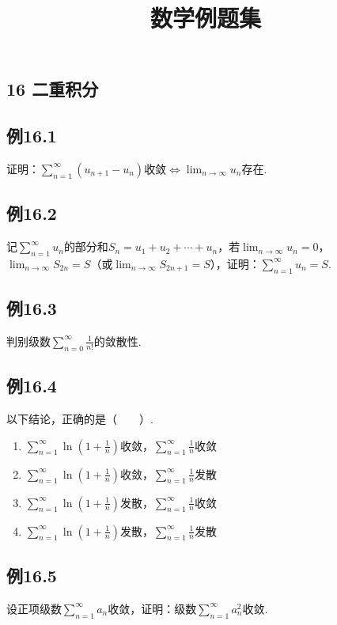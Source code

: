 \documentclass[UTF8]{ctexart}
\title{数学例题集}
\author{}
\date{}
\theoremstyle{remark}
\begin{document}
	\maketitle
	\begin{multicols}{2}
	\section*{16 二重积分}
	\subsection*{例16.1}
	证明：\(\sum_{n = 1}^{\infty}(u_{n + 1}-u_n)\)收敛\(\Leftrightarrow\lim_{n\rightarrow\infty}u_n\)存在.
	
	\subsection*{例16.2}
	记\(\sum_{n = 1}^{\infty}u_n\)的部分和\(S_n = u_1 + u_2+\cdots+u_n\)，若\(\lim_{n\rightarrow\infty}u_n = 0\)，\(\lim_{n\rightarrow\infty}S_{2n}=S\)（或\(\lim_{n\rightarrow\infty}S_{2n + 1}=S\)），证明：\(\sum_{n = 1}^{\infty}u_n=S\).
	
	\subsection*{例16.3}
	判别级数\(\sum_{n = 0}^{\infty}\frac{1}{n!}\)的敛散性.
	
	\subsection*{例16.4}
	以下结论，正确的是（~~~~）.
	\begin{enumerate}[label=(\Alph*)]
		\item \(\sum_{n = 1}^{\infty}\ln\left(1+\frac{1}{n}\right)\)收敛，\(\sum_{n = 1}^{\infty}\frac{1}{n}\)收敛
		\item \(\sum_{n = 1}^{\infty}\ln\left(1+\frac{1}{n}\right)\)收敛，\(\sum_{n = 1}^{\infty}\frac{1}{n}\)发散
		\item \(\sum_{n = 1}^{\infty}\ln\left(1+\frac{1}{n}\right)\)发散，\(\sum_{n = 1}^{\infty}\frac{1}{n}\)收敛
		\item \(\sum_{n = 1}^{\infty}\ln\left(1+\frac{1}{n}\right)\)发散，\(\sum_{n = 1}^{\infty}\frac{1}{n}\)发散
	\end{enumerate}
	
	\subsection*{例16.5}
	设正项级数\(\sum_{n = 1}^{\infty}a_n\)收敛，证明：级数\(\sum_{n = 1}^{\infty}a_n^2\)收敛.
	

\end{multicols}
\end{document}
